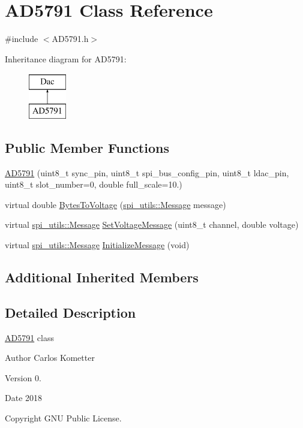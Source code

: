\hypertarget{classAD5791}{}\section{A\+D5791 Class Reference}
\label{classAD5791}


{\ttfamily \#include $<$A\+D5791.\+h$>$}

Inheritance diagram for A\+D5791\+:\begin{figure}[H]
\begin{center}
\leavevmode
\includegraphics[height=2.000000cm]{classAD5791}
\end{center}
\end{figure}
\subsection*{Public Member Functions}
\begin{DoxyCompactItemize}
\item 
\mbox{\hyperlink{classAD5791_ac7e74d16f21a12a552ecf76cf50e46d2}{A\+D5791}} (uint8\+\_\+t sync\+\_\+pin, uint8\+\_\+t spi\+\_\+bus\+\_\+config\+\_\+pin, uint8\+\_\+t ldac\+\_\+pin, uint8\+\_\+t slot\+\_\+number=0, double full\+\_\+scale=10.)
\item 
virtual double \mbox{\hyperlink{classAD5791_ab1f3eef8afe6989d9981bb29ddec9ec5}{Bytes\+To\+Voltage}} (\mbox{\hyperlink{structspi__utils_1_1Message}{spi\+\_\+utils\+::\+Message}} message)
\item 
virtual \mbox{\hyperlink{structspi__utils_1_1Message}{spi\+\_\+utils\+::\+Message}} \mbox{\hyperlink{classAD5791_af2d4276c910abe162aab867b9f86aa5f}{Set\+Voltage\+Message}} (uint8\+\_\+t channel, double voltage)
\item 
virtual \mbox{\hyperlink{structspi__utils_1_1Message}{spi\+\_\+utils\+::\+Message}} \mbox{\hyperlink{classAD5791_a770015b1cc9fd808356dab2f2598f894}{Initialize\+Message}} (void)
\end{DoxyCompactItemize}
\subsection*{Additional Inherited Members}


\subsection{Detailed Description}
\mbox{\hyperlink{classAD5791}{A\+D5791}} class \begin{DoxyAuthor}{Author}
Carlos Kometter 
\end{DoxyAuthor}
\begin{DoxyVersion}{Version}
0. 
\end{DoxyVersion}
\begin{DoxyDate}{Date}
2018 
\end{DoxyDate}
\begin{DoxyCopyright}{Copyright}
G\+NU Public License. 
\end{DoxyCopyright}


